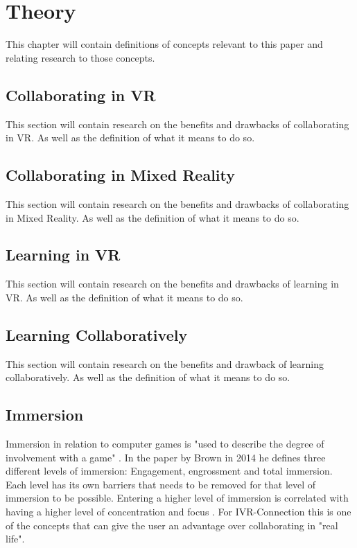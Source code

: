 \chapter{Theory} %
This chapter will contain definitions of concepts relevant to this paper and relating research to those concepts. %
    \section{Collaborating in VR} %
    This section will contain research on the benefits and drawbacks of collaborating in VR. As well as the definition of what it means to do so.
    
    \section{Collaborating in Mixed Reality}
    This section will contain research on the benefits and drawbacks of collaborating in Mixed Reality. As well as the definition of what it means to do so.
    
    \section{Learning in VR} %
    This section will contain research on the benefits and drawbacks of learning in VR. As well as the definition of what it means to do so.
    
    \section{Learning Collaboratively} %
    This section will contain research on the benefits and drawback of learning collaboratively. As well as the definition of what it means to do so.
    
    \section{Immersion} %
    Immersion in relation to computer games is "used to describe the degree of involvement with a game" \cite{Brown:2004:GIG:985921.986048}. In the paper by Brown in 2014 he defines three different levels of immersion: Engagement, engrossment and total immersion. Each level has its own barriers that needs to be removed for that level of immersion to be possible. Entering a higher level of immersion is correlated with having a higher level of concentration and focus \cite{JENNETT2008641}. For IVR-Connection this is one of the concepts that can give the user an advantage over collaborating in "real life".
    

